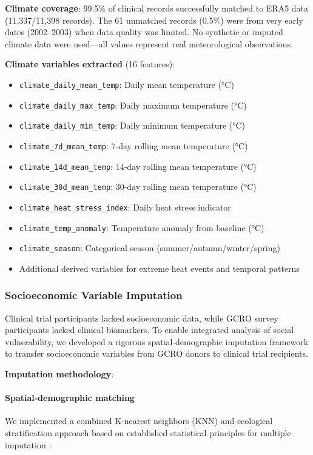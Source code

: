 \textbf{Climate coverage}: 99.5\% of clinical records successfully matched to ERA5 data (11,337/11,398 records). The 61 unmatched records (0.5\%) were from very early dates (2002--2003) when data quality was limited. No synthetic or imputed climate data were used---all values represent real meteorological observations.

\textbf{Climate variables extracted} (16 features):
\begin{itemize}
    \item \texttt{climate\_daily\_mean\_temp}: Daily mean temperature (°C)
    \item \texttt{climate\_daily\_max\_temp}: Daily maximum temperature (°C)
    \item \texttt{climate\_daily\_min\_temp}: Daily minimum temperature (°C)
    \item \texttt{climate\_7d\_mean\_temp}: 7-day rolling mean temperature (°C)
    \item \texttt{climate\_14d\_mean\_temp}: 14-day rolling mean temperature (°C)
    \item \texttt{climate\_30d\_mean\_temp}: 30-day rolling mean temperature (°C)
    \item \texttt{climate\_heat\_stress\_index}: Daily heat stress indicator
    \item \texttt{climate\_temp\_anomaly}: Temperature anomaly from baseline (°C)
    \item \texttt{climate\_season}: Categorical season (summer/autumn/winter/spring)
    \item Additional derived variables for extreme heat events and temporal patterns
\end{itemize}

\subsubsection{Socioeconomic Variable Imputation}

Clinical trial participants lacked socioeconomic data, while GCRO survey participants lacked clinical biomarkers. To enable integrated analysis of social vulnerability, we developed a rigorous spatial-demographic imputation framework to transfer socioeconomic variables from GCRO donors to clinical trial recipients.

\textbf{Imputation methodology}:

\paragraph{Spatial-demographic matching}
We implemented a combined K-nearest neighbors (KNN) and ecological stratification approach based on established statistical principles for multiple imputation \citep{rubin1987multiple, little2020statistical}:

